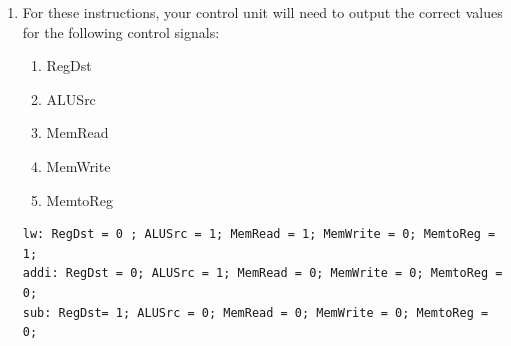 \documentclass[12pt]{article}
\begin{document}
\begin{enumerate}
    \item For these instructions, your control unit will need to output the correct values for the following control signals:
    \begin{enumerate}
        \item RegDst
        \item ALUSrc
        \item MemRead
        \item MemWrite
        \item MemtoReg
    \end{enumerate}
         \begin{verbatim}
lw: RegDst = 0 ; ALUSrc = 1; MemRead = 1; MemWrite = 0; MemtoReg = 1; 
addi: RegDst = 0; ALUSrc = 1; MemRead = 0; MemWrite = 0; MemtoReg = 0;
sub: RegDst= 1; ALUSrc = 0; MemRead = 0; MemWrite = 0; MemtoReg = 0;
\end{verbatim}


\end{enumerate}
\end{document}
